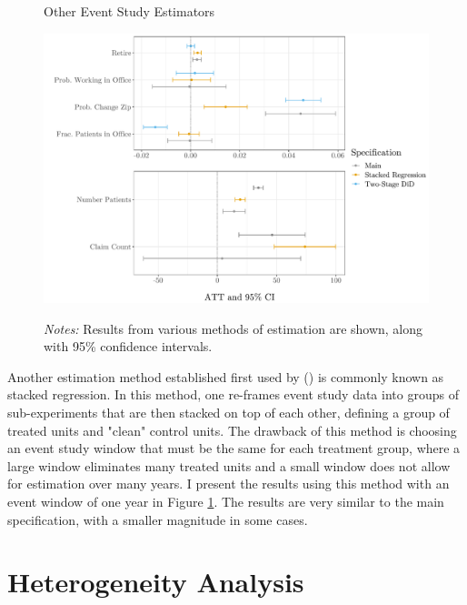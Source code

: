 \documentclass[12pt]{article}
\begin{document}
\begin{figure}[ht]
    \centering
    \captionsetup{width=.57\linewidth}
    \caption{Other Event Study Estimators}
    \includegraphics[scale=.57]{Objects/estimators_graph.pdf}
    \label{fig:esimators}
    \vspace{2mm}
    \caption*{\footnotesize{\textit{Notes:} Results from various methods of estimation are shown, along with 95\% confidence intervals.}}
\end{figure}

Another estimation method established first used by \citeauthor{cengiz2019effect} (\citeyear{cengiz2019effect}) is commonly known as stacked regression. In this method, one re-frames event study data into groups of sub-experiments that are then stacked on top of each other, defining a group of treated units and "clean" control units. The drawback of this method is choosing an event study window that must be the same for each treatment group, where a large window eliminates many treated units and a small window does not allow for estimation over many years. I present the results using this method with an event window of one year in Figure \ref{fig:esimators}. The results are very similar to the main specification, with a smaller magnitude in some cases. 





\section{Heterogeneity Analysis}
\end{document}
